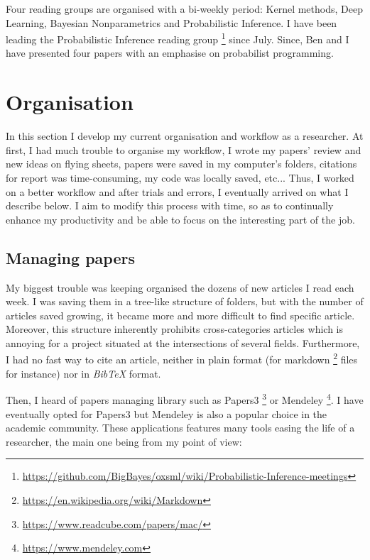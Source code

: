 Four reading groups are organised with a bi-weekly period: Kernel methods, Deep Learning, Bayesian Nonparametrics and Probabilistic Inference.
I have been leading the Probabilistic Inference reading group \footnote{\url{https://github.com/BigBayes/oxsml/wiki/Probabilistic-Inference-meetings}} since July. Since, Ben and I have presented four papers \cite{Ritchie:2016ve, Edward, Ritchie:2015tx, DelMoral:2015jk} with an emphasise on probabilist programming.

\section{Organisation}
In this section I develop my current organisation and workflow as a researcher.
At first, I had much trouble to organise my workflow, I wrote my papers' review and new ideas on flying sheets, papers were saved in my computer's folders, citations for report was time-consuming, my code was locally saved, etc... 
Thus, I worked on a better workflow and after trials and errors, I eventually arrived on what I describe below.
I aim to modify this process with time, so as to continually enhance my productivity and be able to focus on the interesting part of the job.

\subsection{Managing papers}
My biggest trouble was keeping organised the dozens of new articles I read each week.
I was saving them in a tree-like structure of folders, but with the number of articles saved growing, it became more and more difficult to find specific article.
Moreover, this structure inherently prohibits cross-categories articles which is annoying for a project situated at the intersections of several fields.
Furthermore, I had no fast way to cite an article, neither in plain format (for markdown \footnote{\url{https://en.wikipedia.org/wiki/Markdown}} files for instance) nor in \emph{BibTeX} format.

Then, I heard of papers managing library such as Papers3 \footnote{\url{https://www.readcube.com/papers/mac/}} or Mendeley \footnote{\url{https://www.mendeley.com}}.
I have eventually opted for Papers3 but Mendeley is also a popular choice in the academic community.
These applications features many tools easing the life of a researcher, the main one being from my point of view:

